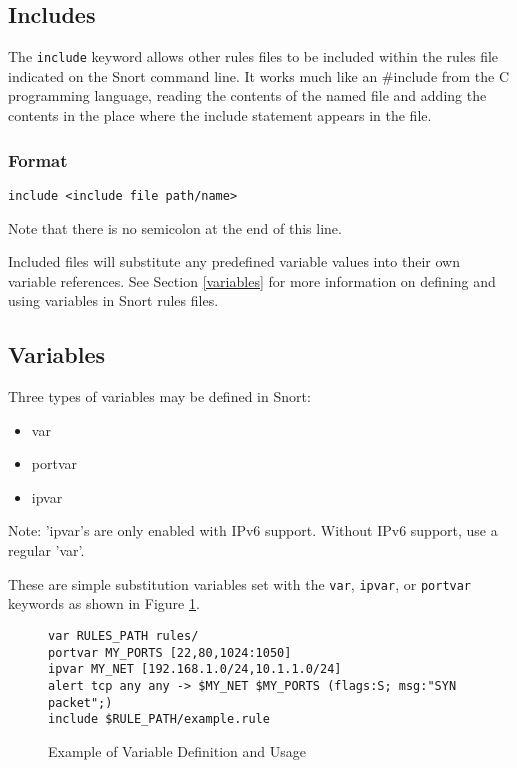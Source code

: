 \documentclass[english]{report}
\newenvironment{note}{
\samepage
    \vspace{10pt}{\textsf{
        {\hspace{7pt}\Huge{$\triangle$\hspace{-12.5pt}{\Large{$^!$}}}}\hspace{5pt}
        {\Large{NOTE}}
    }
    }
   \begin{center}
    \par\vspace{-17pt}

    \begin{lrbox}{\savepar}
    \begin{minipage}[r]{6in}
}
{
    \end{minipage}
    \end{lrbox}
    \fbox{
        \usebox{
            \savepar
	}
    }
    \par\vskip10pt
    \end{center}
}
\newenvironment{note}{
        \begin{rawhtml}
        <p><table border="1"><tr><td><b>
        Note:&nbsp;&nbsp;</b>
        \end{rawhtml}
}{
        \begin{rawhtml}
        </b></td></tr></table></p>
        \end{rawhtml}
}
\begin{document}
\subsection{Includes}

The {\tt include} keyword allows other rules files to be included within the rules
file indicated on the Snort command line. It works much like an \#include from
the C programming language, reading the contents of the named file and adding the contents
in the place where the include statement appears in the file.

\subsubsection{Format}
\begin{verbatim}
include <include file path/name>
\end{verbatim}

\begin{note}
Note that there is no semicolon at the end of this line. 
\end{note}

Included files will
substitute any predefined variable values into their own variable references.
See Section \ref{variables} for more information on defining and
using variables in Snort rules files.

\subsection{Variables \label{variables}}

Three types of variables may be defined in Snort:

\begin{itemize}
\item var
\item portvar
\item ipvar
\end{itemize}

\begin{note}
Note: 'ipvar's are only enabled with IPv6 support. Without IPv6 support, use a
regular 'var'.
\end{note}

These are simple substitution variables set with the {\tt var}, {\tt ipvar}, 
or {\tt portvar} keywords as shown in Figure \ref{variable definition}.


\begin{figure}[!hbpt]
\begin{verbatim}
var RULES_PATH rules/
portvar MY_PORTS [22,80,1024:1050]
ipvar MY_NET [192.168.1.0/24,10.1.1.0/24]
alert tcp any any -> $MY_NET $MY_PORTS (flags:S; msg:"SYN packet";)
include $RULE_PATH/example.rule
\end{verbatim}
\caption{Example of Variable Definition and Usage\label{variable definition}}
\end{figure}
\end{document}
